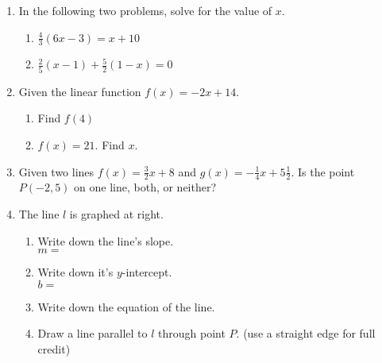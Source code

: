\begin{enumerate}
\newpage
\item In the following two problems, solve for the value of $x$.
  \begin{multicols}{2}
    \begin{enumerate}
      \item   $\frac{4}{3}(6x-3)=x + 10$
      \item   $\frac{2}{5}(x-1)+\frac{5}{2}(1-x)=0$
    \end{enumerate}
  \end{multicols}
  \vspace{6cm}

\item Given the linear function $f(x)=-2x+14$.
\begin{multicols}{2}
  \begin{enumerate}
    \item Find $f(4)$
    \item   $f(x)=21$. Find $x$.
  \end{enumerate}
\end{multicols} \vspace{4cm}

\item Given two lines $\displaystyle f(x)=\frac{3}{2}x+8$ and $\displaystyle g(x)=-\frac{1}{4}x+5\frac{1}{2}$. Is the point $P(-2,5)$ on one line, both, or neither? \vspace{4cm} 

\item The line $l$ is graphed at right.
\begin{multicols}{2}
\begin{enumerate}
  \item Write down the line's slope.\\ $m=$
  \vspace{0.5cm}
  \item Write down it's $y$-intercept.\\ $b=$
  \vspace{0.5cm}
  \item Write down the equation of the line.
  \vspace{1.5cm}
  \item Draw a line parallel to $l$ through point $P$. (use a straight edge for full credit)
\end{enumerate} \vspace{.5cm}
  \begin{center} 
  \end{center}
\end{multicols}


\end{enumerate}
